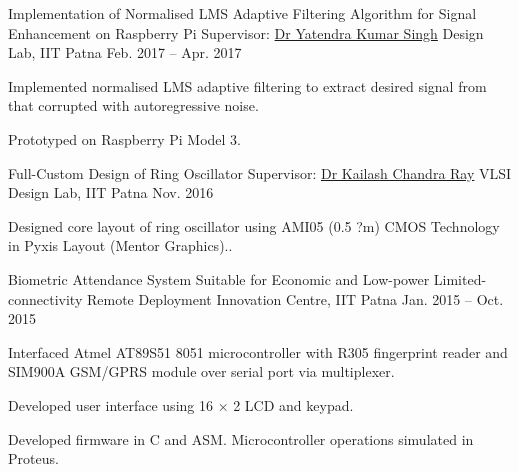 
\begin{cvprojects}

\cvproject
	{Implementation of Normalised LMS Adaptive Filtering Algorithm for Signal Enhancement on Raspberry Pi} %
	{Supervisor: \href{https://www.iitp.ac.in/index.php/departments/engineering/electrical-engineering/people/faculty/dr-yatendra-kumar-singh.html}{Dr Yatendra Kumar Singh}} %
	{Design Lab, IIT Patna} %
	{Feb. 2017 -- Apr. 2017} %
	{\begin{cvitems} %
		\item {Implemented normalised LMS adaptive filtering to extract desired signal from that corrupted with autoregressive noise.}
		\item {Prototyped on Raspberry Pi Model 3.}
	\end{cvitems}}

\cvproject
	{Full-Custom Design of Ring Oscillator} %
	{Supervisor: \href{https://www.iitp.ac.in/index.php/departments/engineering/electrical-engineering/people/faculty/dr-kailash-chandra-ray.html}{Dr Kailash Chandra Ray}} %
	{VLSI Design Lab, IIT Patna} %
	{Nov. 2016} %
	{\begin{cvitems} %
		\item {Designed core layout of ring oscillator using AMI05 (0.5 ?m) CMOS Technology in Pyxis Layout (Mentor Graphics)..}
	\end{cvitems}}

\cvproject
	{Biometric Attendance System Suitable for Economic and Low-power Limited-connectivity Remote Deployment} %
	{} %
	{Innovation Centre, IIT Patna} %
	{Jan. 2015 -- Oct. 2015} %
	{\begin{cvitems} %
		\item {Interfaced Atmel AT89S51 8051 microcontroller with R305 fingerprint reader and SIM900A GSM/GPRS module over serial port via multiplexer.}
		\item {Developed user interface using 16 $\times$ 2 LCD and keypad.}
		\item {Developed firmware in C and ASM. Microcontroller operations simulated in Proteus.}
	\end{cvitems}}

\end{cvprojects}
